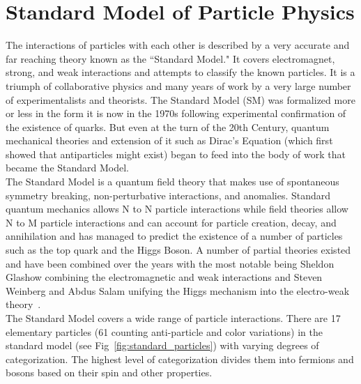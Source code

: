 	\section{Standard Model of Particle Physics}
	The interactions of particles with each other is described by a very accurate and far reaching theory known as the ``Standard Model." It covers electromagnet, strong, and weak  interactions and attempts to classify the known particles. It is a triumph of collaborative physics and many years of work by a very large number of experimentalists and theorists. The Standard Model (SM) was formalized more or less in the form it is now in the 1970s following experimental confirmation of the existence of quarks. But even at the turn of the 20th Century, quantum mechanical theories and extension of it such as Dirac's Equation (which first showed that antiparticles might exist) began to feed into the body of work that became the Standard Model.\\
	
	The Standard Model is a quantum field theory that makes use of spontaneous symmetry breaking, non-perturbative interactions, and anomalies.  Standard quantum mechanics allows N to N particle interactions while field theories allow N to M particle interactions and can account for particle creation, decay, and annihilation and has managed to predict the existence of a number of particles such as the top quark and the Higgs Boson. A number of partial theories existed and have been combined over the years with the most notable being Sheldon Glashow combining the electromagnetic and weak interactions and Steven Weinberg and Abdus Salam unifying the Higgs mechanism into the electro-weak theory~\cite{halzen}.\\
	
	The Standard Model covers a wide range of particle interactions. There are 17 elementary particles (61 counting anti-particle and color variations) in the standard model (see Fig~\ref{fig:standard_particles}) with varying degrees of categorization. The highest level of categorization divides them into fermions and bosons based on their spin and other properties.
	
